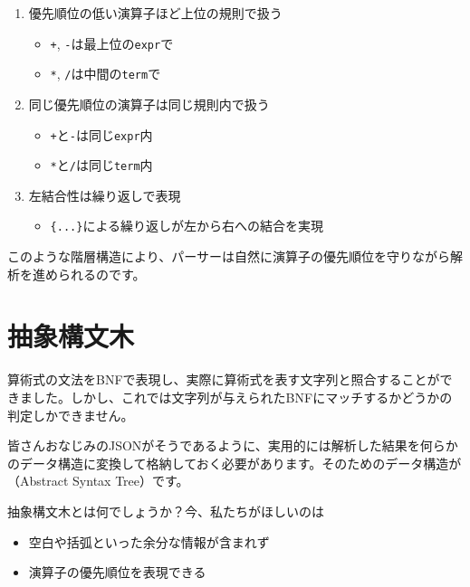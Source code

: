 \begin{enumerate}
\item
  優先順位の低い演算子ほど上位の規則で扱う

\begin{itemize}
\item
  \texttt{+}, \texttt{-}は最上位の\texttt{expr}で
\item
  \texttt{*}, \texttt{/}は中間の\texttt{term}で
\end{itemize}

\item
  同じ優先順位の演算子は同じ規則内で扱う

\begin{itemize}
\item
  \texttt{+}と\texttt{-}は同じ\texttt{expr}内
\item
  \texttt{*}と\texttt{/}は同じ\texttt{term}内
\end{itemize}

\item
  左結合性は繰り返しで表現

\begin{itemize}
\item
  \texttt{\{...\}}による繰り返しが左から右への結合を実現
\end{itemize}
\end{enumerate}

このような階層構造により、パーサーは自然に演算子の優先順位を守りながら解析を進められるのです。

\section{抽象構文木}

算術式の文法をBNFで表現し、実際に算術式を表す文字列と照合することができました。しかし、これでは文字列が与えられたBNFにマッチするかどうかの判定しかできません。

皆さんおなじみのJSONがそうであるように、実用的には解析した結果を何らかのデータ構造に変換して格納しておく必要があります。そのためのデータ構造が（Abstract Syntax Tree）です。

抽象構文木とは何でしょうか？今、私たちがほしいのは

\begin{itemize}
\item
  空白や括弧といった余分な情報が含まれず
\item
  演算子の優先順位を表現できる
\end{itemize}

